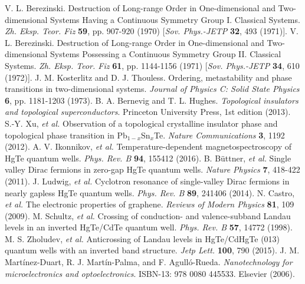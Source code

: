 \documentclass[titlepage,a4paper]{book}
\begin{document}
\begin{thebibliography}{99}
V. L. Berezinski. Destruction of Long-range Order in One-dimensional and Two-dimensional Systems Having a Continuous Symmetry Group I. Classical Systems. \textit{Zh. Eksp. Teor. Fiz} \textbf{59}, pp. 907-920 (1970) [\textit{Sov. Phys.-JETP} \textbf{32}, 493 (1971)].
V. L. Berezinski. Destruction of Long-range Order in One-dimensional and Two-dimensional Systems Possessing a Continuous Symmetry Group II. Classical Systems. \textit{Zh. Eksp. Teor. Fiz} \textbf{61}, pp. 1144-1156 (1971) [\textit{Sov. Phys.-JETP} \textbf{34}, 610 (1972)].
J. M. Kosterlitz and D. J. Thouless. Ordering, metastability and phase transitions in two-dimensional systems. \textit{Journal of Physics C: Solid State Physics} \textbf{6}, pp. 1181-1203 (1973).
B. A. Bernevig and T. L. Hughes. \textit{Topological insulators and topological superconductors}. Princeton University Press, 1st edition (2013).
S.-Y. Xu, \textit{et al.} Observation of a topological crystalline insulator phase and topological phase transition in Pb$_{1-x}$Sn$_{x}$Te. \textit{Nature Communications} \textbf{3}, 1192 (2012).
A. V. Ikonnikov, \textit{et al.} Temperature-dependent magnetospectroscopy of HgTe quantum wells. \textit{Phys. Rev. B} \textbf{94}, 155412 (2016).
B. Büttner, \textit{et al.} Single valley Dirac fermions in zero-gap HgTe quantum wells. \textit{Nature Physics} \textbf{7}, 418-422 (2011).
J. Ludwig, \textit{et al.} Cyclotron resonance of single-valley Dirac fermions in nearly gapless HgTe quantum wells. \textit{Phys. Rev. B} \textbf{89}, 241406 (2014).
N. Castro, \textit{et al.} The electronic properties of graphene. \textit{Reviews of Modern Physics} \textbf{81}, 109 (2009).
M. Schultz, \textit{et al.} Crossing of conduction- and valence-subband Landau levels in an inverted HgTe/CdTe quantum well. \textit{Phys. Rev. B} \textbf{57}, 14772 (1998).
M. S. Zholudev, \textit{et al.} Anticrossing of Landau levels in HgTe/CdHgTe (013) quantum wells with an inverted band structure. \textit{Jetp Lett.} \textbf{100}, 790 (2015).
J. M. Martínez-Duart, R. J. Martín-Palma, and F. Agulló-Rueda. \textit{Nanotechnology for microelectronics and optoelectronics}. ISBN-13: 978 0080 445533. Elsevier (2006).

\end{thebibliography}
\end{document}
